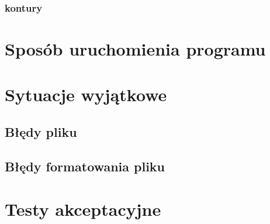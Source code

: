 \documentclass[hidelinks,10pt,a4paper]{article}
\begin{document}
\subsubsection{kontury}





\section{Sposób uruchomienia programu}








\section{Sytuacje wyjątkowe}

\subsection{Błędy pliku}


\subsection{Błędy formatowania pliku}




\section{Testy akceptacyjne}
\end{document}

